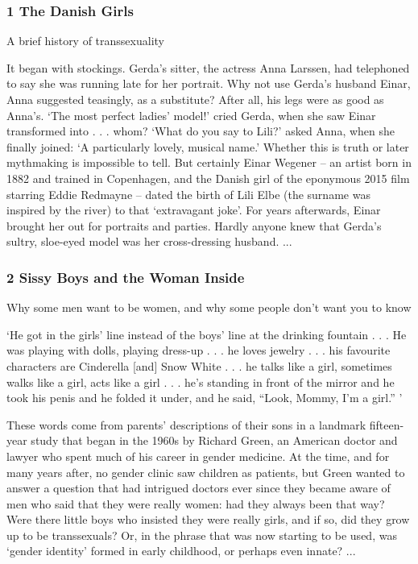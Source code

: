\documentclass[10pt,titlepage]{book}
\begin{document}
\subsubsection{1 The Danish Girls}

A brief history of transsexuality

It began with stockings. Gerda’s sitter, the actress Anna Larssen, had telephoned to say she was running late for her portrait. Why not use Gerda’s husband Einar, Anna suggested teasingly, as a substitute? After all, his legs were as good as Anna’s. ‘The most perfect ladies’ model!’ cried Gerda, when she saw Einar transformed into . . . whom? ‘What do you say to Lili?’ asked Anna, when she finally joined: ‘A particularly lovely, musical name.’ Whether this is truth or later mythmaking is impossible to tell. But certainly Einar Wegener – an artist born in 1882 and trained in Copenhagen, and the Danish girl of the eponymous 2015 film starring Eddie Redmayne – dated the birth of Lili Elbe (the surname was inspired by the river) to that ‘extravagant joke’. For years afterwards, Einar brought her out for portraits and parties. Hardly anyone knew that Gerda’s sultry, sloe-eyed model was her cross-dressing husband.
...

\subsubsection{2 Sissy Boys and the Woman Inside}

Why some men want to be women, and why some people don’t want you to know

‘He got in the girls’ line instead of the boys’ line at the drinking fountain . . . He was playing with dolls, playing dress-up . . . he loves jewelry . . . his favourite characters are Cinderella [and] Snow White . . . he talks like a girl, sometimes walks like a girl, acts like a girl . . . he’s standing in front of the mirror and he took his penis and he folded it under, and he said, “Look, Mommy, I’m a girl.” ’

These words come from parents’ descriptions of their sons in a landmark fifteen-year study that began in the 1960s by Richard Green, an American doctor and lawyer who spent much of his career in gender medicine. At the time, and for many years after, no gender clinic saw children as patients, but Green wanted to answer a question that had intrigued doctors ever since they became aware of men who said that they were really women: had they always been that way? Were there little boys who insisted they were really girls, and if so, did they grow up to be transsexuals? Or, in the phrase that was now starting to be used, was ‘gender identity’ formed in early childhood, or perhaps even innate?
...
\end{document}
